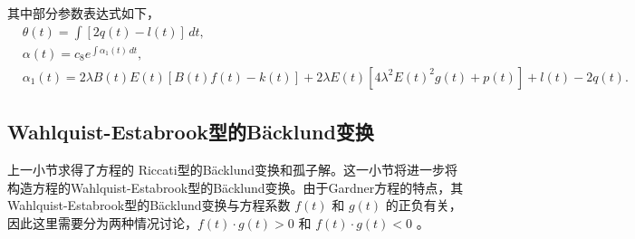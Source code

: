 其中部分参数表达式如下，
\begin{align}
&\theta(t)=\int [2 q(t)-l(t)] \, dt,
\\&
\alpha(t)=c_{8} e^{\int \alpha_1(t) \, dt},
\\&
\alpha_1(t)=2 \lambda  B(t) E(t)[ B(t)f(t)- k(t)]+2 \lambda  E(t)[4 \lambda ^2 E(t)^2 g(t)+ p(t)]+l(t)-2 q(t).
\end{align}
\subsection{Wahlquist-Estabrook型的B\"{a}cklund变换}
上一小节求得了方程的 Riccati型的B\"{a}cklund变换和孤子解。这一小节将进一步将构造方程的Wahlquist-Estabrook型的B\"{a}cklund变换。由于Gardner方程的特点，其Wahlquist-Estabrook型的B\"{a}cklund变换与方程系数 $f(t)$ 和 $g(t)$ 的正负有关，因此这里需要分为两种情况讨论，$f(t) \cdot g(t) >0$ 和 $f(t) \cdot g(t) <0$ 。

\vspace{1mm}
\vspace{1mm}

